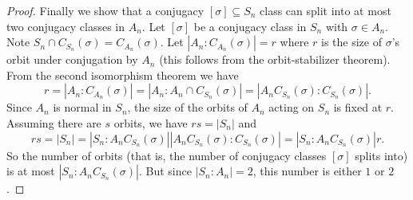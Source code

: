 \documentclass{article}
\begin{document}
\begin{proof}
Finally we show that a conjugacy $[\sigma] \subseteq S_n$ class can split into at most two conjugacy classes in $A_n$. Let $[\sigma]$ be a conjugacy class in $S_n$ with $\sigma \in A_n$. Note $S_n \cap C_{S_n}(\sigma) = C_{A_n}(\sigma)$. Let $|A_n : C_{A_n}(\sigma)| = r$ where $r$ is the size of $\sigma$'s orbit under conjugation by $A_n$ (this follows from the orbit-stabilizer theorem). From the second isomorphism theorem we have
\[
r = |A_n : C_{A_n}(\sigma)| = |A_n : A_n \cap C_{S_n}(\sigma)| = |A_nC_{S_n}(\sigma) : C_{S_n}(\sigma)|.
\]
Since $A_n$ is normal in $S_n$, the size of the orbits of $A_n$ acting on $S_n$ is fixed at $r$. Assuming there are $s$ orbits, we have $rs = |S_n|$ and
\[
rs = |S_n| = |S_n : A_nC_{S_n}(\sigma)||A_nC_{S_n}(\sigma) : C_{S_n}(\sigma)| = |S_n : A_nC_{S_n}(\sigma)|r.
\]
So the number of orbits (that is, the number of conjugacy classes $[\sigma]$ splits into) is at most $|S_n : A_nC_{S_n}(\sigma)|$. But since $|S_n : A_n| = 2$, this number is either $1$ or $2$.
\end{proof}
\end{document}
